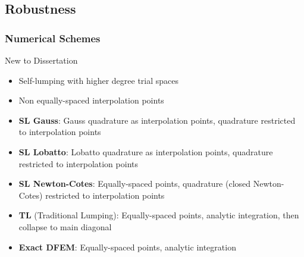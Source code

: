 \documentclass{beamer}
\begin{document}
\subsection{Robustness}
\begin{frame}
\frametitle{Numerical Schemes}
\begin{block}{New to Dissertation}
\begin{small}
\begin{itemize} 
\item Self-lumping with higher degree trial spaces
\item Non equally-spaced interpolation points
\end{itemize}
\end{small}
\end{block}
\begin{itemize}
\item {\bf SL Gauss}: Gauss quadrature as interpolation points, quadrature restricted to interpolation points
\item {\bf SL Lobatto}: Lobatto quadrature as interpolation points, quadrature restricted to interpolation points
\item {\bf SL Newton-Cotes}: Equally-spaced points, quadrature (closed Newton-Cotes) restricted to interpolation points
\item {\bf TL} (Traditional Lumping): Equally-spaced points, analytic integration, then collapse to main diagonal
\item {\bf Exact DFEM}: Equally-spaced points, analytic integration
\end{itemize}
\end{frame}
\end{document}
